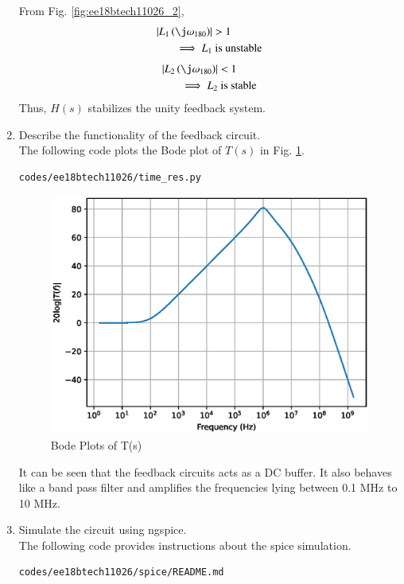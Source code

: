 \begin{enumerate}[label=\arabic*.,ref=\theenumi]
From Fig. \ref{fig:ee18btech11026_2},
\begin{align}
\abs{L_1\brak{\j\omega_{180}}} &> 1 
\\
\implies L_{1} &\text{ is unstable}
\end{align}
\begin{align}
\abs{L_2\brak{\j\omega_{180}}} & < 1 
\\
\implies L_{2} &\text{ is stable}
\end{align}
%
Thus, $H(s)$ stabilizes the unity feedback system.
\item Describe the functionality of the feedback circuit.
\\
\solution  
The following code plots the Bode plot of $T(s)$ in Fig. \ref{fig:ee18btech11026_bode}.
\begin{lstlisting}
codes/ee18btech11026/time_res.py
\end{lstlisting}
\begin{figure}[!h]
    \centering
    \includegraphics[width=\columnwidth]{./figs/ee18btech11026/Bodeplot.eps}
    \caption{Bode Plots of T(s)}
    \label{fig:ee18btech11026_bode}
\end{figure}
It can be seen that the feedback circuits acts as a DC buffer.  It also behaves like a band pass filter and amplifies the frequencies lying between 0.1 MHz to 10 MHz.
%
\item Simulate the circuit using ngspice.
%
\\
\solution 
The following code provides instructions about the spice simulation.
\begin{lstlisting}
codes/ee18btech11026/spice/README.md
\end{lstlisting}


\end{enumerate}
